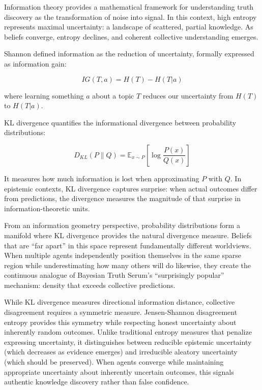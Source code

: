 \documentclass[11pt,a4paper]{article}
\begin{document}
Information theory \cite{shannon1948mathematical,shannon1948mathematical_part2} provides a mathematical framework for understanding truth discovery as the transformation of noise into signal. In this context, high entropy represents maximal uncertainty: a landscape of scattered, partial knowledge. As beliefs converge, entropy declines, and coherent collective understanding emerges.

Shannon \cite{shannon1948mathematical} defined information as the reduction of uncertainty, formally expressed as information gain:

$$IG(T,a) = H(T) - H(T|a)$$

where learning something $a$ about a topic $T$ reduces our uncertainty from $H(T)$ to $H(T|a)$.

KL divergence quantifies the informational divergence between probability distributions:

$$D_{KL}(P \| Q) = \mathbb{E}_{x \sim P}\left[\log \frac{P(x)}{Q(x)}\right]$$

It measures how much information is lost when approximating $P$ with $Q$. In epistemic contexts, KL divergence captures surprise: when actual outcomes differ from predictions, the divergence measures the magnitude of that surprise in information-theoretic units.

From an information geometry perspective, probability distributions form a manifold where KL divergence provides the natural divergence measure. Beliefs that are ``far apart'' in this space represent fundamentally different worldviews. When multiple agents independently position themselves in the same sparse region while underestimating how many others will do likewise, they create the continuous analogue of Bayesian Truth Serum's ``surprisingly popular'' mechanism: density that exceeds collective predictions.

While KL divergence measures directional information distance, collective disagreement requires a symmetric measure. Jensen-Shannon disagreement entropy provides this symmetry while respecting honest uncertainty about inherently random outcomes. Unlike traditional entropy measures that penalize expressing uncertainty, it distinguishes between reducible epistemic uncertainty (which decreases as evidence emerges) and irreducible aleatory uncertainty (which should be preserved). When agents converge while maintaining appropriate uncertainty about inherently uncertain outcomes, this signals authentic knowledge discovery rather than false confidence.
\end{document}
